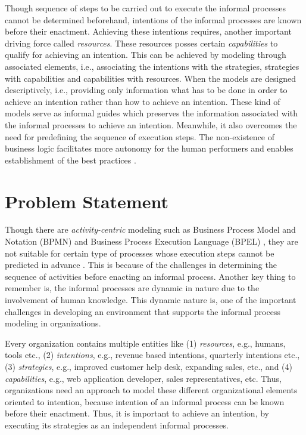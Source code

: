 Though sequence of steps to be carried out to execute the informal processes cannot be determined beforehand, intentions of the informal processes are known before their enactment. Achieving these intentions requires, another important driving force called \textit{resources}. These resources posses certain \textit{capabilities} to qualify for achieving an intention. This can be achieved by modeling through associated elements, i.e., associating the intentions with the strategies, strategies with capabilities and capabilities with resources. When the models are designed descriptively, i.e., providing only information what has to be done in order to achieve an intention rather than how to achieve an intention. These kind of models serve as informal guides which preserves the information associated with the informal processes to achieve an intention. Meanwhile, it also overcomes the need for predefining the sequence of execution steps. The non-existence of business logic facilitates more autonomy for the human performers and enables establishment of the best practices \cite{Sungur2014a}.

\section{Problem Statement}
\label{sec:problemstatement}
Though there are \textit{activity-centric} modeling such as Business Process Model and Notation (BPMN) \cite{bpm2011} and Business Process Execution Language (BPEL) \cite{Std.2007}, they are not suitable for certain type of processes whose execution steps cannot be predicted in advance \cite{Sungur2014a}. This is because of the challenges in determining the sequence of activities before enacting an informal process. Another key thing to remember is, the informal processes are dynamic in nature due to the involvement of human knowledge. This dynamic nature is, one of the important challenges in developing an environment that supports the informal process modeling in organizations.

Every organization contains multiple entities like (1) \textit{resources}, e.g., humans, tools etc., (2) \textit{intentions}, e.g., revenue based intentions, quarterly intentions etc., (3) \textit{strategies}, e.g., improved customer help desk, expanding sales, etc., and (4) \textit{capabilities}, e.g., web application developer, sales representatives, etc. Thus, organizations need an approach to model these different organizational elements oriented to intention, because intention of an informal process can be known before their enactment. Thus, it is important to achieve an intention, by executing its strategies as an independent informal processes.  

